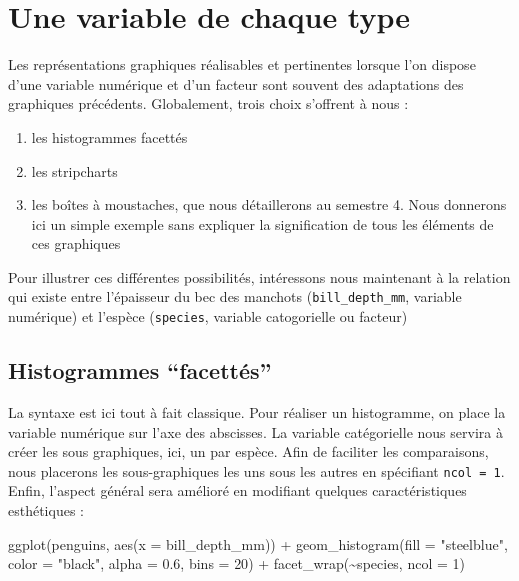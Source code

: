 \documentclass[
  a4paper,
  DIV=11,
  numbers=noendperiod,
  oneside]{scrreprt}
\newenvironment{Shaded}{}{}
\newcommand{\AttributeTok}[1]{\textcolor[rgb]{0.84,0.23,0.29}{#1}}
\newcommand{\DecValTok}[1]{\textcolor[rgb]{0.00,0.36,0.77}{#1}}
\newcommand{\FloatTok}[1]{\textcolor[rgb]{0.00,0.36,0.77}{#1}}
\newcommand{\FunctionTok}[1]{\textcolor[rgb]{0.44,0.26,0.76}{#1}}
\newcommand{\NormalTok}[1]{\textcolor[rgb]{0.14,0.16,0.18}{#1}}
\newcommand{\SpecialCharTok}[1]{\textcolor[rgb]{0.00,0.36,0.77}{#1}}
\newcommand{\StringTok}[1]{\textcolor[rgb]{0.01,0.18,0.38}{#1}}
\providecommand{\tightlist}{%
  \setlength{\itemsep}{0pt}\setlength{\parskip}{0pt}}\usepackage{longtable,booktabs,array}
\begin{document}
\section{Une variable de chaque type}\label{une-variable-de-chaque-type}

Les représentations graphiques réalisables et pertinentes lorsque l'on
dispose d'une variable numérique et d'un facteur sont souvent des
adaptations des graphiques précédents. Globalement, trois choix
s'offrent à nous :

\begin{enumerate}
\def\labelenumi{\arabic{enumi}.}
\tightlist
\item
  les histogrammes facettés
\item
  les stripcharts
\item
  les boîtes à moustaches, que nous détaillerons au semestre 4. Nous
  donnerons ici un simple exemple sans expliquer la signification de
  tous les éléments de ces graphiques
\end{enumerate}

Pour illustrer ces différentes possibilités, intéressons nous maintenant
à la relation qui existe entre l'épaisseur du bec des manchots
(\texttt{bill\_depth\_mm}, variable numérique) et l'espèce
(\texttt{species}, variable catogorielle ou facteur)

\subsection{Histogrammes ``facettés''}\label{sec-factorhisto}

La syntaxe est ici tout à fait classique. Pour réaliser un histogramme,
on place la variable numérique sur l'axe des abscisses. La variable
catégorielle nous servira à créer les sous graphiques, ici, un par
espèce. Afin de faciliter les comparaisons, nous placerons les
sous-graphiques les uns sous les autres en spécifiant
\texttt{ncol\ =\ 1}. Enfin, l'aspect général sera amélioré en modifiant
quelques caractéristiques esthétiques :

\begin{Shaded}
\begin{Highlighting}[]
\FunctionTok{ggplot}\NormalTok{(penguins, }\FunctionTok{aes}\NormalTok{(}\AttributeTok{x =}\NormalTok{ bill\_depth\_mm)) }\SpecialCharTok{+}
  \FunctionTok{geom\_histogram}\NormalTok{(}\AttributeTok{fill =} \StringTok{"steelblue"}\NormalTok{, }\AttributeTok{color =} \StringTok{"black"}\NormalTok{, }
                 \AttributeTok{alpha =} \FloatTok{0.6}\NormalTok{, }\AttributeTok{bins =} \DecValTok{20}\NormalTok{) }\SpecialCharTok{+}
  \FunctionTok{facet\_wrap}\NormalTok{(}\SpecialCharTok{\textasciitilde{}}\NormalTok{species, }\AttributeTok{ncol =} \DecValTok{1}\NormalTok{)}
\end{Highlighting}
\end{Shaded}
\end{document}
